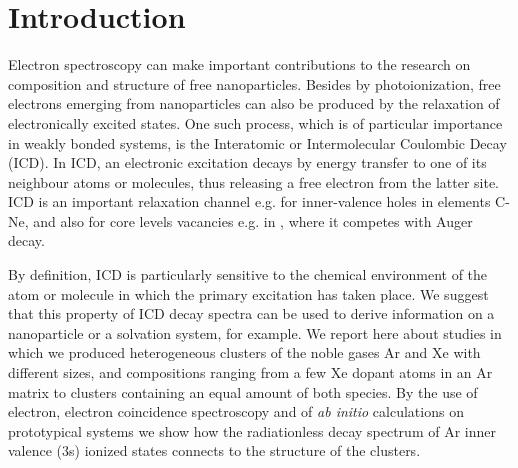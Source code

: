 \section{Introduction}
%
Electron spectroscopy can make important contributions to the 
research on composition and structure of free nanoparticles.\cite{
jpcc} Besides by photoionization, free electrons emerging from 
nanoparticles can also be produced by the relaxation of 
electronically excited states. One such process, which is of 
particular importance in weakly bonded systems, is the 
Interatomic or Intermolecular Coulombic Decay (ICD).\cite{
cederbaum} In ICD, an electronic excitation decays by energy 
transfer to one of its neighbour atoms or molecules, thus 
releasing a free electron from the latter site. ICD is an 
important relaxation channel e.g. for inner-valence holes in 
elements C-Ne, and also for core levels vacancies e.g. in 
, where it competes with Auger decay\cite{slavicek}. 

By definition, ICD is particularly sensitive to the chemical 
environment of the atom or molecule in which the primary 
excitation has taken place. We suggest that this property of ICD 
decay spectra can be used to derive information on a nanoparticle 
or a solvation system, for example. We report here about studies 
in which we produced heterogeneous clusters of the noble gases Ar 
and Xe with different sizes, and compositions ranging from a few 
Xe dopant atoms in an Ar matrix to clusters containing an equal 
amount of both species. By the use of electron, electron 
coincidence spectroscopy and of {\it ab initio} calculations on 
prototypical systems we show how the radiationless decay spectrum 
of Ar inner valence (3s) ionized states connects to the structure 
of the clusters.

